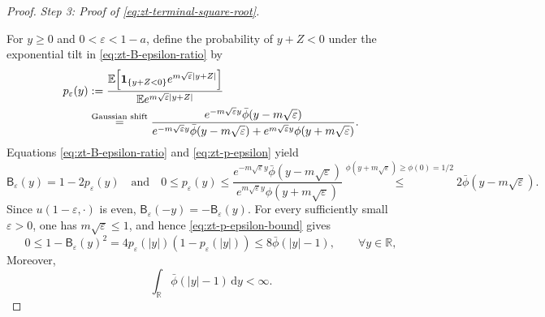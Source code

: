 \documentclass[10pt]{amsart}
\theoremstyle{definition}
\theoremstyle{remark}
\numberwithin{equation}{section}
\newcommand{\R}{\mathbb R}
\newcommand{\E}{\mathbb E}
\newcommand{\1}{\mathbf 1}
\newcommand{\dd}{\,\mathrm d}
\newcommand{\stackref}[2]{\stackrel{#2}{#1}}
\begin{document}
\begin{proof}
\smallskip
\noindent\emph{Step 3: Proof of \eqref{eq:zt-terminal-square-root}.}

For $y\geq0$ and $0<\varepsilon<1-a$, define the probability of $y+Z<0$ under the exponential tilt in \eqref{eq:zt-B-epsilon-ratio} by
\begin{align}
 p_\varepsilon(y)
 &:=\frac{\E\!\left[\1_{\{y+Z<0\}}e^{m\sqrt\varepsilon|y+Z|}\right]}
 {\E e^{m\sqrt\varepsilon|y+Z|}}\notag\\
 &\stackref{=}{\text{Gaussian shift}}
 \frac{e^{-m\sqrt\varepsilon y}\bar\phi(y-m\sqrt\varepsilon)}
 {e^{-m\sqrt\varepsilon y}\bar\phi(y-m\sqrt\varepsilon)
  +e^{m\sqrt\varepsilon y}\phi(y+m\sqrt\varepsilon)}.
 \label{eq:zt-p-epsilon}
\end{align}
Equations \eqref{eq:zt-B-epsilon-ratio} and \eqref{eq:zt-p-epsilon} yield
\begin{equation}
 \mathsf B_\varepsilon(y)=1-2p_\varepsilon(y)
 \quad\text{and}\quad
 0\leq p_\varepsilon(y)
 \leq\frac{e^{-m\sqrt\varepsilon y}\bar\phi(y-m\sqrt\varepsilon)}
 {e^{m\sqrt\varepsilon y}\phi(y+m\sqrt\varepsilon)}
 \stackref{\leq}{\phi(y+m\sqrt\varepsilon)\geq\phi(0)=1/2}
 2\bar\phi(y-m\sqrt\varepsilon).
 \label{eq:zt-p-epsilon-bound}
\end{equation}
Since $u(1-\varepsilon,\cdot)$ is even, $\mathsf B_\varepsilon(-y)=-\mathsf B_\varepsilon(y)$. For every sufficiently small $\varepsilon>0$, one has $m\sqrt\varepsilon\leq1$, and hence \eqref{eq:zt-p-epsilon-bound} gives
\begin{equation}
 0\leq1-\mathsf B_\varepsilon(y)^2
 =4p_\varepsilon(|y|)(1-p_\varepsilon(|y|))
 \leq8\bar\phi(|y|-1),
 \qquad \forall y\in\R,
 \label{eq:zt-boundary-dominator}
\end{equation}
Moreover,
\begin{equation*}
 \int_\R\bar\phi(|y|-1)\dd y<\infty.
\end{equation*}


\end{proof}
\end{document}
